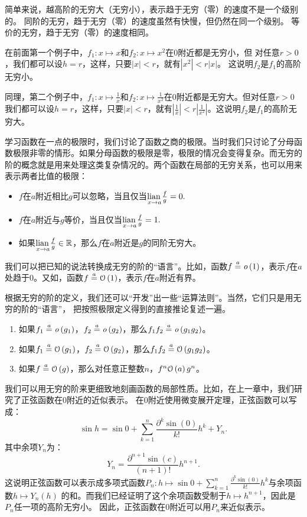 \documentclass[12pt,UTF8,fontset=none]{ctexbook}
\begin{document}
简单来说，越高阶的无穷大（无穷小），表示趋于无穷（零）的速度不是一个级别的。
同阶的无穷，趋于无穷（零）的速度虽然有快慢，但仍然在同一个级别。
等价的无穷，趋于无穷（零）的速度相同。

在前面第一个例子中，$f_1: x\mapsto x$和$f_2: x\mapsto x^2$在$0$附近都是无穷小，但
对任意$r > 0$，我们都可以设$h = r$，这样，只要$|x| < r$，就有$|x^2| < r|x|$。
这说明$f_2$是$f_1$的高阶无穷小。

同理，第二个例子中，$f_1: x\mapsto \frac{1}{x}$和$f_2: x\mapsto \frac{1}{x^2}$在$0$附近都是无穷大。但对任意$r > 0$我们都可以设$h = r$，这样，只要$|x| < r$，就有$|\frac{1}{x}| < r|\frac{1}{x^2}|$。这说明$f_2$是$f_1$的高阶无穷大。

学习函数在一点的极限时，我们讨论了函数之商的极限。当时我们只讨论了分母函数极限非零的情形。如果分母函数的极限是零，极限的情况会变得复杂。而无穷的阶的概念就是用来处理这类复杂情况的。两个函数在局部的无穷关系，也可以用来表示两者比值的极限：
\begin{itemize}
    \item $f$在$a$附近相比$g$可以忽略，当且仅当$\underset{x\to a}{\operatorname{lian}\,} \frac{f}{g} = 0.$
    \item $f$在$a$附近与$g$等价，当且仅当$\underset{x\to a}{\operatorname{lian}\,} \frac{f}{g} = 1.$
    \item 如果$\underset{x\to a}{\operatorname{lian}\,} \frac{f}{g} \in \mathbb{R}$，那么$f$在$a$附近是$g$的同阶无穷大。
\end{itemize}

我们可以把已知的说法转换成无穷的阶的“语言”。比如，函数$f \overset{a}{=} \mathit{o}\left(1\right)$，表示$f$在$a$处趋于$0$。又如，函数$f \overset{a}{=} \mathcal{O}\left(1\right)$，表示$f$在$a$附近有界。

根据无穷的阶的定义，我们还可以“开发”出一些“运算法则”。当然，它们只是用无穷的阶的“语言”，
把按照极限定义得到的直接推论复述一遍。
\begin{enumerate}
    \item 如果$f_1 \overset{a}{=} \mathit{o}\left(g_1\right)$，$f_2 \overset{a}{=} \mathit{o}\left(g_2\right)$，那么$f_1 f_2 \overset{a}{=} \mathit{o}\left(g_1 g_2\right)$。
    \item 如果$f_1 \overset{a}{=} \mathcal{O}\left(g_1\right)$，$f_2 \overset{a}{=} \mathcal{O}\left(g_2\right)$，那么$f_1 f_2 \overset{a}{=} \mathcal{O}\left(g_1 g_2\right)$。
    \item 如果$f \overset{a}{=} \mathcal{O}\left(g\right)$，那么对任意正整数$n$，$f^n \mathcal{O}\left(a\right){g^n}$。
\end{enumerate}

我们可以用无穷的阶来更细致地刻画函数的局部性质。比如，在上一章中，我们研究了正弦函数在$0$附近的近似表示。
在$0$附近使用微变展开定理，正弦函数可以写成：
$$ \sin{h} = \sin{0} + \sum_{k=1}^n \frac{\partial^k \sin (0)}{k!}h^k + Y_n. $$
其中余项$Y_n$为：
$$ Y_n = \frac{\partial^{n+1} \sin (c)}{(n+1)!}h^{n+1}. $$
这说明正弦函数可以表示成多项式函数$P_n :h \mapsto \sin{0} + \sum_{k=1}^n \frac{\partial^k \sin (0)}{k!}h^k$与余项函数$h\mapsto Y_n(h)$
的和。而我们已经证明了这个余项函数受制于$h\mapsto h^{n+1}$，因此是$P_n$任一项的高阶无穷小。
因此，正弦函数在$0$附近可以用$P_n$来近似表示。
\end{document}
